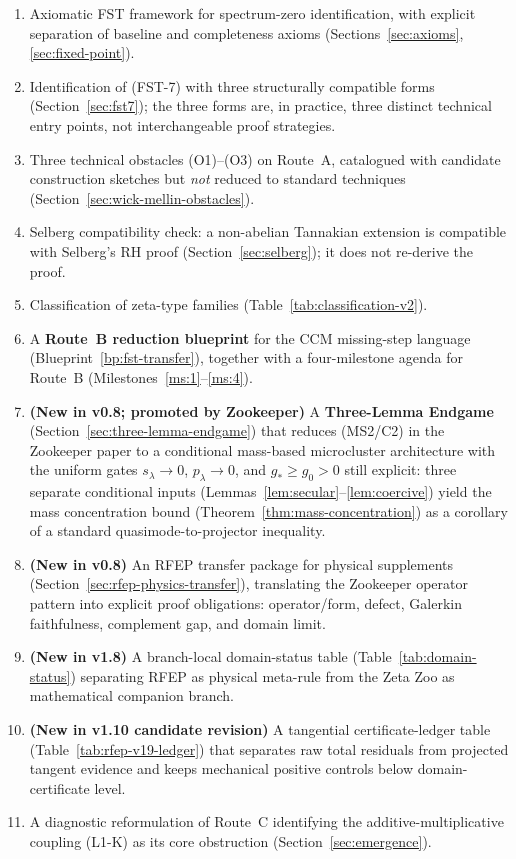 \documentclass[11pt,a4paper]{article}
\theoremstyle{plain}
\theoremstyle{definition}
\begin{document}
\begin{enumerate}[leftmargin=*]
\item Axiomatic FST framework for spectrum-zero identification,
  with explicit separation of baseline and completeness axioms
  (Sections~\ref{sec:axioms}, \ref{sec:fixed-point}).
\item Identification of (FST-7) with three structurally compatible
  forms (Section~\ref{sec:fst7}); the three forms are, in practice,
  three distinct technical entry points, not interchangeable proof
  strategies.
\item Three technical obstacles (O1)--(O3) on Route~A, catalogued
  with candidate construction sketches but \emph{not} reduced to
  standard techniques (Section~\ref{sec:wick-mellin-obstacles}).
\item Selberg compatibility check: a non-abelian Tannakian extension
  is compatible with Selberg's RH proof
  (Section~\ref{sec:selberg}); it does not re-derive the proof.
\item Classification of zeta-type families
  (Table~\ref{tab:classification-v2}).
\item A \textbf{Route~B reduction blueprint} for the CCM
  missing-step language
  (Blueprint~\ref{bp:fst-transfer}), together with a
  four-milestone agenda for Route~B
  (Milestones~\ref{ms:1}--\ref{ms:4}).
\item \textbf{(New in v0.8; promoted by Zookeeper)} A
  \textbf{Three-Lemma Endgame}
  (Section~\ref{sec:three-lemma-endgame}) that reduces
  (MS2/C2) in the Zookeeper paper to a conditional mass-based
  microcluster architecture with the uniform gates
  $s_\lambda\to0$, $p_\lambda\to0$, and $g_*\ge g_0>0$ still
  explicit: three separate conditional inputs
  (Lemmas~\ref{lem:secular}--\ref{lem:coercive}) yield the
  mass concentration bound
  (Theorem~\ref{thm:mass-concentration}) as a corollary of
  a standard quasimode-to-projector inequality.
\item \textbf{(New in v0.8)} An RFEP transfer package for physical
  supplements (Section~\ref{sec:rfep-physics-transfer}), translating
  the Zookeeper operator pattern into explicit proof obligations:
  operator/form, defect, Galerkin faithfulness, complement gap, and
  domain limit.
\item \textbf{(New in v1.8)} A branch-local domain-status table
  (Table~\ref{tab:domain-status}) separating RFEP as physical
  meta-rule from the Zeta Zoo as mathematical companion branch.
\item \textbf{(New in v1.10 candidate revision)} A tangential
  certificate-ledger table (Table~\ref{tab:rfep-v19-ledger}) that
  separates raw total residuals from projected tangent evidence and
  keeps mechanical positive controls below domain-certificate level.
\item A diagnostic reformulation of Route~C identifying the
  additive-multiplicative coupling (L1-K) as its core obstruction
  (Section~\ref{sec:emergence}).
\end{enumerate}
\end{document}
